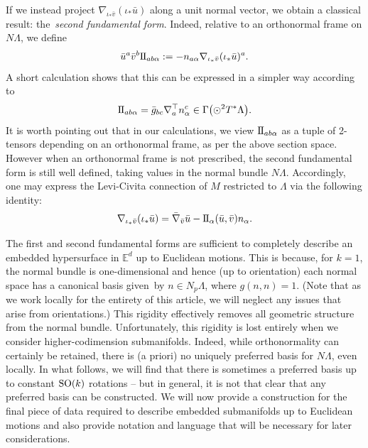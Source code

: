 \documentclass[pdftex]{sigma}
\numberwithin{equation}{section}
\newcommand{\II}{{\rm I\hspace{-.2mm}I}}
\renewcommand{\=}{\stackrel \Lambda =}
\begin{document}
If we instead project $\nabla_{\iota_* \bar{v}} (\iota_* \bar{u})$ along a unit normal vector, we obtain a classical result: the~\textit{second fundamental form}. Indeed, relative to an orthonormal frame on $N \Lambda$, we define
\[
\bar{u}^a \bar{v}^b \II_{ab \alpha} := -n_{a \alpha} \nabla_{\iota_* \bar{v}} (\iota_* \bar{u})^a .
\]
A short calculation shows that this can be expressed in a simpler way according to
\[
\II_{ab \alpha} = \bar{g}_{bc} \nabla^\top_a n^c_{\alpha} \in \Gamma\bigl(\odot^2 T^* \Lambda\bigr) .
\]
It is worth pointing out that in our calculations, we view $\II_{ab \alpha}$ as a tuple of 2-tensors depending on an orthonormal frame, as per the above section space. However when an orthonormal frame is not prescribed, the second fundamental form is still well defined, taking values in the normal bundle $N \Lambda$.
Accordingly, one may express the Levi-Civita connection of $M$ restricted to $\Lambda$ via the following identity:
\[
\nabla_{\iota_* \bar{v}} (\iota_* \bar{u}) = \bar{\nabla}_{\bar{v}} \bar{u} - \II_{\alpha}(\bar{u},\bar{v}) n_{\alpha} .
\]

The first and second fundamental forms are sufficient to completely describe an embedded hypersurface in $\mathbb{E}^d$ up to Euclidean motions. This is because, for $k=1$, the normal bundle is one-dimensional and hence (up to orientation) each normal space has a canonical basis given~by $n \in N_p \Lambda$, where $g(n,n) = 1$. (Note that as we work locally for the entirety of this article, we will neglect any issues that arise from orientations.) This rigidity effectively removes all geometric structure from the normal bundle. Unfortunately, this rigidity is lost entirely when we consider higher-codimension submanifolds. Indeed, while orthonormality can certainly be retained, there is (a priori) no uniquely preferred basis for $N \Lambda$, even locally. In what follows, we will find that there is sometimes a preferred basis up to constant ${\rm SO}(k)$ rotations -- but in general, it is not that clear that any preferred basis can be constructed. We will now provide a construction for the final piece of data required to describe embedded submanifolds up to Euclidean motions and also provide notation and language that will be necessary for later considerations.
\end{document}
